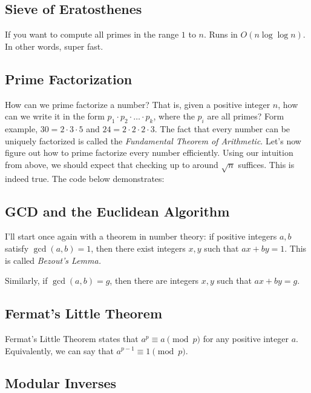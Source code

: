 \subsection{Sieve of Eratosthenes}

If you want to compute all primes in the range $1$ to $n$. Runs in $O(n \log \log n)$. In other words, super fast.

\subsection{Prime Factorization}

How can we prime factorize a number? That is, given a positive integer $n$, how can we write it in the form $p_1 \cdot p_2 \cdot \dots \cdot p_k$, where the $p_i$ are all primes? Form example, $30 = 2 \cdot 3 \cdot 5$ and $24 = 2 \cdot 2 \cdot 2 \cdot 3$. The fact that every number can be uniquely factorized is called the \emph{Fundamental Theorem of Arithmetic}. Let's now figure out how to prime factorize every number efficiently. Using our intuition from above, we should expect that checking up to around $\sqrt{n}$ suffices. This is indeed true. The code below demonstrates:

\subsection{GCD and the Euclidean Algorithm}

I'll start once again with a theorem in number theory: if positive integers $a, b$ satisfy $\gcd(a, b) = 1$, then there exist integers $x, y$ such that $ax+by=1.$ This is called \emph{Bezout's Lemma.}

Similarly, if $\gcd(a, b) = g$, then there are integers $x, y$ such that $ax+by = g.$


\subsection{Fermat's Little Theorem}

Fermat's Little Theorem states that $a^p \equiv a \pmod{p}$ for any positive integer $a.$ Equivalently, we can say that $a^{p-1} \equiv 1 \pmod{p}.$

\subsection{Modular Inverses}

